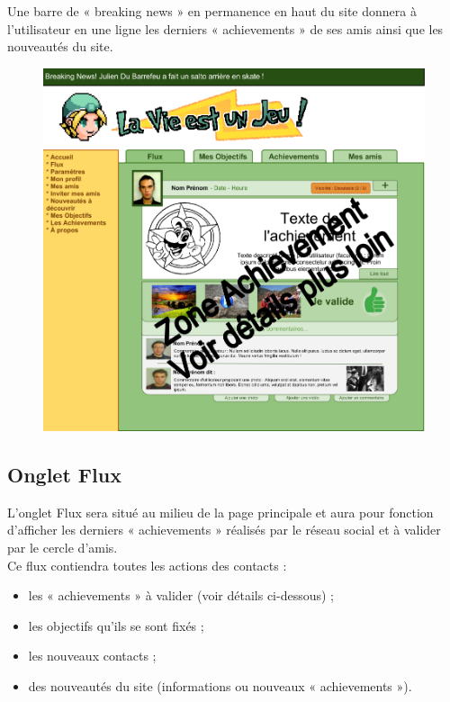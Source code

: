 \documentclass{life-fr}
\begin{document}
Une barre de « breaking news » en permanence en haut du site donnera à l'utilisateur en une ligne les derniers « achievements » de ses amis ainsi que les nouveautés du site.

\begin{figure}[H]
  \begin{center}
    \includegraphics[width=15cm]{img/accueil.png}
  \end{center}
\end{figure}


\subsection{Onglet Flux}

L'onglet Flux sera situé au milieu de la page principale et aura pour fonction d'afficher les derniers « achievements » réalisés par le réseau social et à valider par le cercle d'amis.\\

Ce flux contiendra toutes les actions des contacts :

\begin{itemize}
  \item les « achievements » à valider (voir détails ci-dessous) ;
  \item les objectifs qu'ils se sont fixés ;
  \item les nouveaux contacts ;
  \item des nouveautés du site (informations ou nouveaux « achievements »).
\end{itemize}
\end{document}
